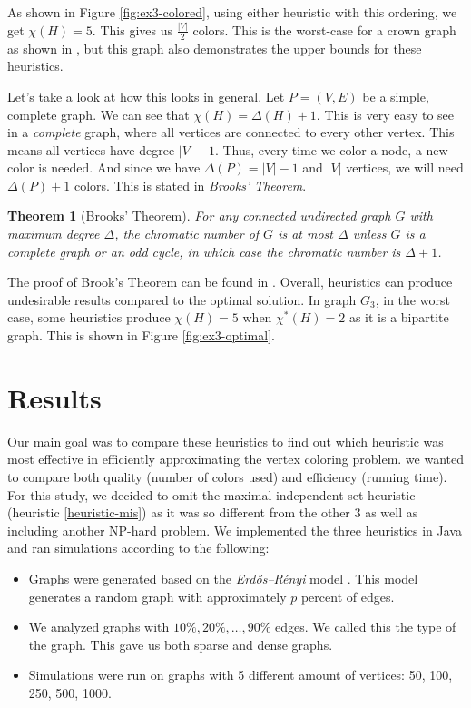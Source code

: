 \documentclass{article}
\newcounter{heuristic} \setcounter{heuristic}{0}
\newtheorem{theorem}{Theorem}
\theoremstyle{definition}
\begin{document}
\vspace{-0.3cm}

As shown in Figure \ref{fig:ex3-colored}, using either heuristic with this ordering, we get \(\chi(H) = 5\). This gives us \(\frac{|V|}{2}\) colors. This is the worst-case for a crown graph as shown in \cite{johnson}, but this graph also demonstrates the upper bounds for these heuristics.

Let's take a look at how this looks in general. Let \(P = (V, E)\) be a simple, complete graph. We can see that \(\chi(H) = \Delta(H) + 1\). This is very easy to see in a \emph{complete} graph, where all vertices are connected to every other vertex. This means all vertices have degree \(|V| - 1\). Thus, every time we color a node, a new color is needed. And since we have \(\Delta(P) = |V| - 1\) and \(|V|\) vertices, we will need \(\Delta(P) + 1\) colors. This is stated in \emph{Brooks' Theorem}.

\begin{theorem}[Brooks' Theorem]
For any connected undirected graph \(G\) with maximum degree \(\Delta\), the chromatic number of \(G\) is at most \(\Delta\) unless \(G\) is a complete graph or an odd cycle, in which case the chromatic number is \(\Delta + 1\).
\end{theorem}

The proof of Brook's Theorem can be found in \cite{lovasz}. Overall, heuristics can produce undesirable results compared to the optimal solution. In graph \(G_3\), in the worst case, some heuristics produce \(\chi(H) = 5\) when \(\chi^{*}(H) = 2\) as it is a bipartite graph. This is shown in Figure \ref{fig:ex3-optimal}.

\vspace{-0.1cm}

\section{Results}
Our main goal was to compare these heuristics to find out which heuristic was most effective in efficiently approximating the vertex coloring problem. we wanted to compare both quality (number of colors used) and efficiency (running time). For this study, we decided to omit the maximal independent set heuristic (heuristic \ref{heuristic-mis}) as it was so different from the other 3 as well as including another NP-hard problem. We implemented the three heuristics in Java and ran simulations according to the following:
\begin{itemize}
  \setlength\itemsep{0.4em}
  \item Graphs were generated based on the \emph{Erdős–Rényi} model \cite{erdds1959random}. This model generates a random graph with approximately $p$ percent of edges.
  \item We analyzed graphs with $10\%, 20\%, \ldots, 90\%$ edges. We called this the type of the graph. This gave us both sparse and dense graphs.
  \item Simulations were run on graphs with 5 different amount of vertices: 50, 100, 250, 500, 1000.
\end{itemize}
\end{document}
